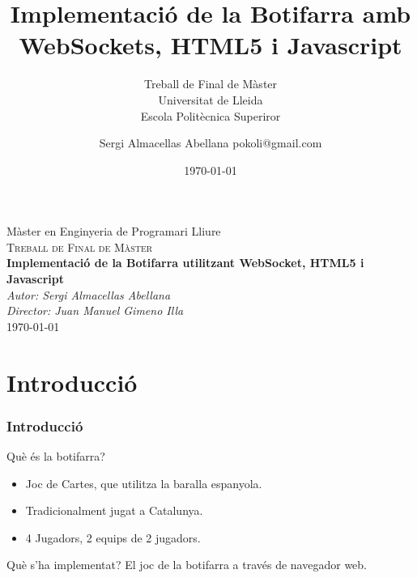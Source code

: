 \documentclass[notitlepage]{beamer}
\title[Implementació de la botifarra a través de Web]{Implementació de la Botifarra amb WebSockets, HTML5 i Javascript }
\subtitle{Treball de Final de Màster\\Universitat de Lleida\\Escola Politècnica Superiror}
\author{Sergi Almacellas Abellana pokoli@gmail.com}
\date{\today}
\begin{document}
\begin{frame}
\begin{center} 

\Large Màster en Enginyeria de Programari Lliure\\
\textsc{\LARGE Treball de Final de Màster}\\[0.5cm]


{\huge \bf Implementació de la Botifarra utilitzant WebSocket, HTML5 i Javascript } \\[0.75cm]

\textsl{Autor: Sergi Almacellas Abellana}\\
\textsl{Director: Juan Manuel Gimeno Illa}\\ 

\vfill\today
\end{center}
\end{frame}

\begin{frame}
\tableofcontents
\end{frame}

\section{Introducció}
\begin{frame}
\frametitle{Introducció}
\begin{block}{Què és la botifarra?}
\begin{itemize}
    \item{Joc de Cartes, que utilitza la baralla espanyola.}
    \item{Tradicionalment jugat a Catalunya.}
    \item{4 Jugadors, 2 equips de 2 jugadors.}
\end{itemize}
\end{block}

\begin{block}{Què s'ha implementat?}
El joc de la botifarra a través de navegador web.
\end{block}
\end{frame}
\end{document}
